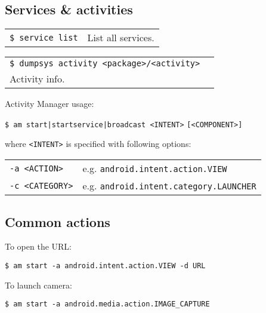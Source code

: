 \documentclass[11pt,landscape,a4paper]{article}
\begin{document}
\begin{multicols}{3}
{\subsection{Services \& activities}
\begin{tabular}{@{}ll@{}}
\texttt{\$ service list} & \hspace*{2.3cm}List all services.\\
\end{tabular}
\begin{tabular}{@{}ll@{}}
\texttt{\$ dumpsys activity <package>/<activity>} & \\
\hspace*{5cm} Activity info. & \\
\end{tabular}
}

\vspace*{2mm}
\parbox{0.30\textwidth}{
Activity Manager usage: 

\vspace*{1mm}

\texttt{\$ am start|startservice|broadcast <INTENT>}
\hspace*{6cm}\texttt{[<COMPONENT>]}

\vspace*{1mm}

where \texttt{<INTENT>} is specified with following options:

\vspace*{1mm}

\begin{tabular}{@{}ll@{}}
\texttt{-a <ACTION>} & e.g. \texttt{android.intent.action.VIEW}\\
\texttt{-c <CATEGORY>} & e.g. \texttt{android.intent.category.LAUNCHER}\\
\end{tabular}}

\vspace*{2mm}

\columnbreak
\subsection{Common actions}
\parbox{0.30\textwidth}{
To open the URL:

\texttt{\$ am start -a android.intent.action.VIEW -d URL}

To launch camera:

\texttt{\$ am start -a android.media.action.IMAGE\_CAPTURE}

}
\end{multicols}
\end{document}
